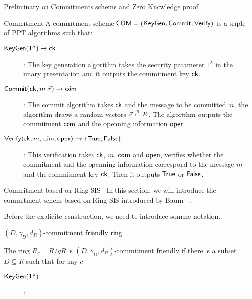 \begin{section}{Preliminary on Commitments scheme and Zero Knowledge proof}
	\begin{definition}{\textsf{Commitment}}
	A commitment scheme $\mathsf{COM} = ({\mathsf{KeyGen}}, {\mathsf{Commit}}, {\mathsf{Verify}})$ is a triple of PPT algorithms such that:
	\begin{description}
		\item[${\mathsf{KeyGen}}	(1^\lambda) \to \mathsf{ck}$]: The key generation algorithm takes the security parameter $1^\lambda$ in the unary presentation and it outputs the commitment key $\mathsf{ck}$.
		\item[${\mathsf{Commit}}(\mathsf{ck}, m; \vec{r}) \to \hat{\mathsf{com}}$]: The commit algorithm takes $\mathsf{ck}$ and the message to be committed $m$, the algorithm draws a random vectors $\vec{r} \stackrel{{\scriptscriptstyle \mkern4mu R}}{\gets} R$. The algorithm outputs the commitment $\hat{\mathsf{com}}$ and the openning information $\mathsf{open}$.
		\item[${\mathsf{Verify}}(\mathsf{ck}, m, \hat{\mathsf{com}}, \mathsf{open}) \to \{\mathsf{True}, \mathsf{False}\}$]: This verification takes $\mathsf{ck}$, $m$, $\hat{\mathsf{com}}$ and $\mathsf{open}$, verifies whether the commitment and the openning information correspond to the message $m$ and the commitment key $\mathsf{ck}$. Then it outputs $\mathsf{True}$ or $\mathsf{False}$.
	\end{description}	
	\end{definition}
\end{section}



\begin{section}{Commitment based on  Ring-SIS~\cite{DBLP:journals/iacr/BaumDOP16}}
	In this section, we will introduce the commitment schem based on Ring-SIS introduced by Baum~\etal~\cite{DBLP:journals/iacr/BaumDOP16}.
	
	Before the explicite construction, we need to introduce somme notation.
	
	\begin{definition}{$(D, \gamma_D, d_R)$-commitment friendly ring}
		
		The ring $R_q = R/qR$ is $(D, \gamma_D, d_R)$-commitment friendly if there is a subset $D \subseteq R$ such that for any $c$ 
		
	\end{definition}
	
	\begin{description}
		\item[${\mathsf{KeyGen}}(1^\lambda)$] :
			
	\end{description}	
	
\end{section}